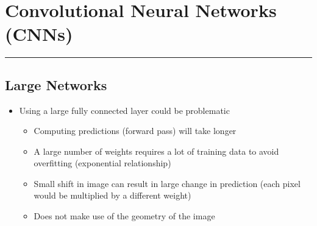 \documentclass[11pt]{article}
\begin{document}
\pagebreak



\section{Convolutional Neural Networks (CNNs)}
\hrule \vspace{15pt}

\subsection{Large Networks}
\begin{itemize}
\item Using a large fully connected layer could be problematic
\begin{itemize}

\item Computing predictions (forward pass) will take longer
\item A large number of weights requires a lot of training data to avoid overfitting (exponential relationship)
\item Small shift in image can result in large change in prediction (each pixel would be multiplied by a different weight)
\item Does not make use of the geometry of the image
\end{itemize}
\end{itemize}
\end{document}
